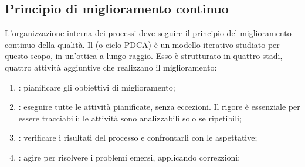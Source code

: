 \subsection{Principio di miglioramento continuo}
L'organizzazione interna dei processi deve seguire il principio del miglioramento continuo della qualità. Il  (o ciclo PDCA) è un modello iterativo studiato per questo scopo, in un'ottica a lungo raggio. Esso è strutturato in quattro stadi, quattro attività aggiuntive che realizzano il miglioramento:

\begin{enumerate}
	\item {}: pianificare gli obbiettivi di miglioramento;
	\item {}: eseguire tutte le attività pianificate, senza eccezioni. Il rigore è essenziale per essere tracciabili: le attività sono analizzabili solo se ripetibili;
	\item {}: verificare i risultati del processo e confrontarli con le aspettative;
	\item {}: agire per risolvere i problemi emersi, applicando correzzioni;
\end{enumerate}
